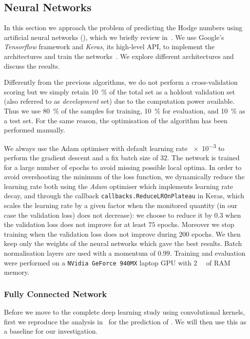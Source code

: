 \subsection{Neural Networks}

In this section we approach the problem of predicting the Hodge numbers using artificial neural networks (\ann), which we briefly review in~.
We use Google's \emph{Tensorflow} framework and \emph{Keras}, its high-level API, to implement the architectures and train the networks~\cite{Abadi:2015:TensorFlowLargescaleMachine}.
We explore different architectures and discuss the results.

Differently from the previous algorithms, we do not perform a cross-validation scoring but we simply retain \SI{10}{\percent} of the total set as a holdout validation set (also referred to as \emph{development} set) due to the computation power available.
Thus we use \SI{80}{\percent} of the samples for training, \SI{10}{\percent} for evaluation, and \SI{10}{\percent} as a test set.
For the same reason, the optimisation of the algorithm has been performed manually.

We always use the Adam optimiser with default learning rate \num{e-3} to perform the gradient descent and a fix batch size of $32$.
The network is trained for a large number of epochs to avoid missing possible local optima.
In order to avoid overshooting the minimum of the loss function, we dynamically reduce the learning rate both using the \emph{Adam} optimiser which implements learning rate decay, and through the callback \texttt{callbacks.ReduceLROnPlateau} in Keras, which scales the learning rate by a given factor when the monitored quantity (in our case the validation loss) does not decrease): we choose to reduce it by $0.3$ when the validation loss does not improve for at least $75$ epochs.
Moreover we stop training when the validation loss does not improve during $200$ epochs.
We then keep only the weights of the neural networks which gave the best results.
Batch normalisation layers are used with a momentum of $0.99$.
Training and evaluation were performed on a \texttt{NVidia GeForce 940MX} laptop GPU with \SI{2}{\giga\byte} of RAM memory.


\subsubsection{Fully Connected Network}

Before we move to the complete deep learning study using convolutional kernels, first we reproduce the analysis in~\cite{Bull:2018:MachineLearningCICY} for the prediction of .
We will then use this as a baseline for our investigation.



